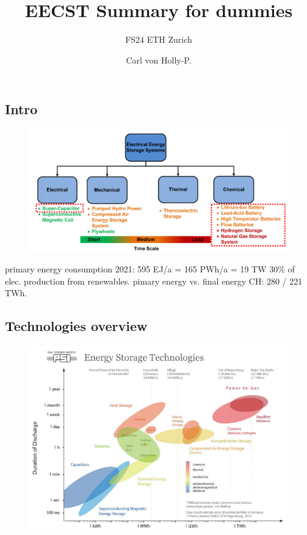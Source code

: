 \documentclass[a4paper,10pt,landscape]{scrartcl}
\title{EECST Summary for dummies}
\subtitle{FS24 ETH Zurich}
\author{Carl von Holly-P.}
\begin{document}
\begin{multicols*}{3}
%
\maketitle
\section{Intro}
\begin{figure}[H]
    \centering\includegraphics[width=\linewidth]{src/overview.png}
    \label{fig:enter-label}
\end{figure}
\vspace{-1cm}
primary energy consumption 2021: 595 EJ/a = 165 PWh/a = 19 TW
30\% of elec. production from renewables. pimary energy vs. final energy CH: 280 / 221 TWh.
\subsection{Technologies overview}
\begin{figure}[H]
    \centering
    \includegraphics[width=.8\linewidth]{src/tech_ow.png}
    \label{fig:tech_ow}
\end{figure}

\end{multicols*}
\end{document}
